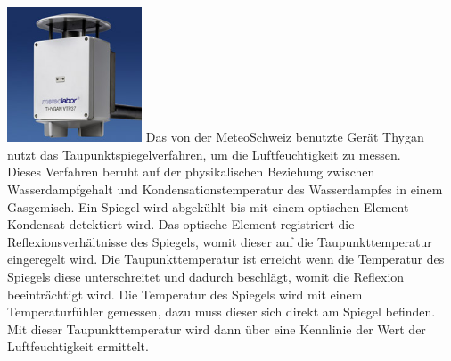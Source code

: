 \newpage
{}
\begin{multicols}{3}
\includegraphics[width=0.3\textwidth]{graphics/thygan.jpg}
Das von der MeteoSchweiz benutzte Gerät Thygan nutzt das Taupunktspiegelverfahren, um die Luftfeuchtigkeit zu messen.\\
Dieses Verfahren beruht auf der physikalischen Beziehung zwischen Wasserdampfgehalt und Kondensationstemperatur des Wasserdampfes in einem Gasgemisch. Ein Spiegel wird abgekühlt bis mit einem optischen Element Kondensat detektiert wird. Das optische Element registriert die Reflexionsverhältnisse des Spiegels, womit dieser auf die Taupunkttemperatur eingeregelt wird. Die Taupunkttemperatur ist erreicht wenn die Temperatur des Spiegels diese unterschreitet und dadurch beschlägt, womit die Reflexion beeinträchtigt wird. Die Temperatur des Spiegels wird mit einem Temperaturfühler gemessen, dazu muss dieser sich direkt am Spiegel befinden. Mit dieser Taupunkttemperatur wird dann über eine Kennlinie der Wert der Luftfeuchtigkeit ermittelt.

\end{multicols} 
